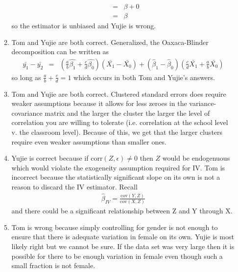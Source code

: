 \documentclass[11pt]{SelfArxOneColBMN}
\begin{document}
\begin{enumerate}
\begin{enumerate}
\begin{eqnarray*}
      &=& \beta + 0\\
      &=& \beta
    \end{eqnarray*}
    so the estimator is unbiased and Yujie is wrong.
    \item Tom and Yujie are both correct. Generalized, the Oaxaca-Blinder decomposition can be written as
    \begin{eqnarray*}
      \bar{y_1} - \bar{y_2} &=& (\frac{a}{b}\hat{\beta_1} + \frac{c}{d}\hat{\beta_0})(\bar{X_1} - \bar{X_0}) + (\hat{\beta}_1 - \hat{\beta}_0)(\frac{c}{d}\bar{X_1} + \frac{a}{b}\bar{X_0})
    \end{eqnarray*}
    so long as $\frac{a}{b} + \frac{c}{d} = 1$ which occurs in both Tom and Yujie's answers.
    \item Tom and Yujie are both correct. Clustered standard errors does require weaker assumptions because it allows for less zeroes in the variance-covariance matrix and the larger the cluster the larger the level of correlation you are willing to tolerate (i.e. correlation at the school level v. the classroom level). Because of this, we get that the larger clusters require even weaker assumptions than smaller ones.
    \item Yujie is correct because if $\text{corr}(Z,\epsilon) \neq 0$ then $Z$ would be endogenuous which would violate the exogeneity assumption required for IV. Tom is incorrect because the statistically significant slope on its own is not a reason to discard the IV estimator. Recall
    \begin{eqnarray}
      \hat{\beta}_{IV} = \frac{\text{cov}(Y,Z)}{\text{cov}(X,Z)}
    \end{eqnarray}
    and there could be a significant relationship between Z and Y through X.
    \item Tom is wrong because simply controlling for gender is not enough to ensure that there is adequate variation in female on its own. Yujie is most likely right but we cannot be sure. If the data set was very large then it is possible for there to be enough variation in female even though such a small fraction is not female.
  \end{enumerate}
\end{enumerate}
\end{document}
